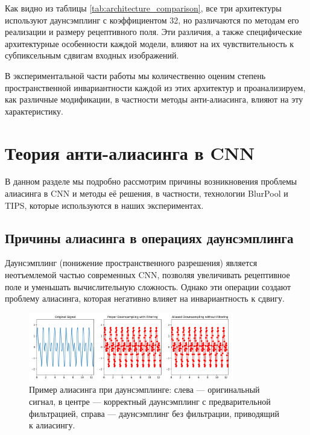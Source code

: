 Как видно из таблицы \ref{tab:architecture_comparison}, все три архитектуры используют даунсэмплинг с коэффициентом 32, но различаются по методам его реализации и размеру рецептивного поля. Эти различия, а также специфические архитектурные особенности каждой модели, влияют на их чувствительность к субпиксельным сдвигам входных изображений.

В экспериментальной части работы мы количественно оценим степень пространственной инвариантности каждой из этих архитектур и проанализируем, как различные модификации, в частности методы анти-алиасинга, влияют на эту характеристику.

\section{Теория анти-алиасинга в CNN}
\label{theory:anti_aliasing}

В данном разделе мы подробно рассмотрим причины возникновения проблемы алиасинга в CNN и методы её решения, в частности, технологии BlurPool и TIPS, которые используются в наших экспериментах.

\subsection{Причины алиасинга в операциях даунсэмплинга}
\label{theory:anti_aliasing:causes}

Даунсэмплинг (понижение пространственного разрешения) является неотъемлемой частью современных CNN, позволяя увеличивать рецептивное поле и уменьшать вычислительную сложность. Однако эти операции создают проблему алиасинга, которая негативно влияет на инвариантность к сдвигу.

\begin{figure}[ht]
\centering
\includegraphics[width=0.8\textwidth]{Dissertation/images/aliasing_example.png}
\caption{Пример алиасинга при даунсэмплинге: слева — оригинальный сигнал, в центре — корректный даунсэмплинг с предварительной фильтрацией, справа — даунсэмплинг без фильтрации, приводящий к алиасингу.}
\label{fig:aliasing_example}
\end{figure}

